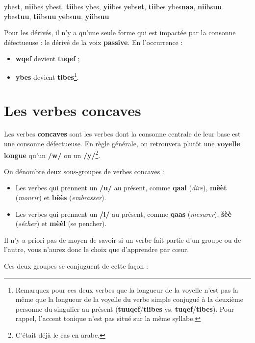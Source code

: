    {ybes\textbf{t}, \textbf{nii}bes}
    {ybes\textbf{t}, \textbf{tii}bes}
    {ybes, \textbf{yii}bes}
    {y\textbf{e}bs\textbf{et}, \textbf{tii}bes}
    {ybes\textbf{naa}, \textbf{nii}bs\textbf{uu}}
    {ybes\textbf{tuu}, \textbf{tii}bs\textbf{uu}}
    {y\textbf{e}bs\textbf{uu}, \textbf{yii}bs\textbf{uu}}

Pour les dérivés, il n'y a qu'une seule forme qui est impactée par la consonne défectueuse : le dérivé de la voix \textbf{passive}. En l'occurrence : 
\begin{itemize}
    \item \textbf{wqef} devient \textbf{tuqef} ;
    \item \textbf{ybes} devient \textbf{tibes}\footnote{Remarquez pour ces deux verbes que la longueur de la voyelle n'est pas la même que la longueur de la voyelle du verbe simple conjugué à la deuxième personne du singulier au présent (\textbf{tuuqef}/\textbf{tiibes} vs. \textbf{tuqef}/\textbf{tibes}). Pour rappel, l'accent tonique n'est pas situé sur la même syllabe.}.
\end{itemize}

\section{Les verbes concaves}

Les verbes \textbf{concaves} sont les verbes dont la consonne centrale de leur base est une consonne défectueuse. En règle générale, on retrouvera plutôt une \textbf{voyelle longue} qu'un \textbf{/w/} ou un \textbf{/y/}\footnote{C'était déjà le cas en arabe.}.

On dénombre deux sous-groupes de verbes concaves : 
\begin{itemize}
    \item Les verbes qui prennent un \textbf{/u/} au présent, comme \textbf{qaal} (\textit{dire}), \textbf{mèèt} (\textit{mourir}) et \textbf{bèès} (\textit{embrasser}).
    \item Les verbes qui prennent un \textbf{/i/} au présent, comme \textbf{qaas} (\textit{mesurer}), \textbf{\v{s}èè\textcrh} (\textit{sécher}) et \textbf{mèèl} (se pencher).
\end{itemize}

Il n'y a priori pas de moyen de savoir si un verbe fait partie d'un groupe ou de l'autre, vous n'aurez donc le choix que d'apprendre par c\oe ur. 

Ces deux groupes se conjuguent de cette façon : 

